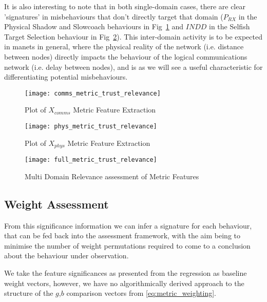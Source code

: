 It is also interesting to note that in both single-domain cases, there are clear 'signatures' in misbehaviours that don't directly target that domain ($P_{RX}$ in the Physical Shadow and Slowcoach behaviours in Fig~\ref{fig:comms_feature_extraction} and $INDD$ in the Selfish Target Selection behaviour in Fig~\ref{fig:phys_feature_extraction}).
This inter-domain activity is to be expected in \gls{manet}s in general, where the physical reality of the network (i.e. distance between nodes) directly impacts the behaviour of the logical communications network (i.e. delay between nodes), and is as we will see a useful characteristic for differentiating potential misbehaviours.



\begin{figure}[h!]
	\centering
  \texttt{[image: comms\_metric\_trust\_relevance]}
	\caption{Plot of $X_{comms}$ Metric Feature Extraction}
	\label{fig:comms_feature_extraction}
\end{figure}

\begin{figure}[h!]
	\centering
  \texttt{[image: phys\_metric\_trust\_relevance]}
	\caption{Plot of $X_{phys}$ Metric Feature Extraction}
	\label{fig:phys_feature_extraction}
\end{figure}

\begin{figure}[h!]
  \centering
  \texttt{[image: full\_metric\_trust\_relevance]}
  \caption{Multi Domain Relevance assessment of Metric Features}
  \label{fig:multi_feature_extraction}
\end{figure}

%

\subsection{Weight Assessment}

From this significance information we can infer a signature for each behaviour, that can be fed back into the assessment framework, with the aim being to minimise the number of weight permutations required to come to a conclusion about the behaviour under observation. 

We take the feature significances as presented from the regression as baseline weight vectors, however, we have no algorithmically derived approach to the structure of the $g$,$b$ comparison vectors from \eqref{eq:metric_weighting}.

